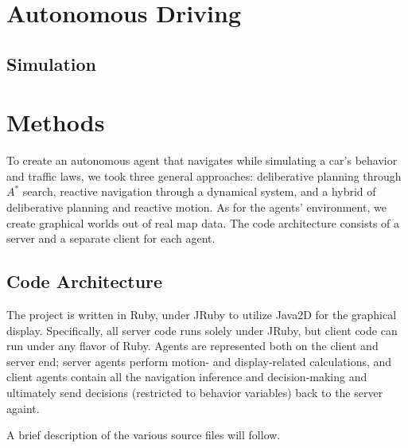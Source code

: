 \documentclass{article}
\begin{document}
\section{Autonomous Driving}

\subsection{Simulation}

\section{Methods}

To create an autonomous agent that navigates while simulating a car's behavior
and traffic laws, we took three general approaches: deliberative planning
through $A^*$ search, reactive navigation through a dynamical system, and a
hybrid of deliberative planning and reactive motion. As for the agents'
environment, we create graphical worlds out of real map data. The code
architecture consists of a server and a separate client for each agent.

\subsection{Code Architecture}

The project is written in Ruby, under JRuby to utilize Java2D for the graphical
display. Specifically, all server code runs solely under JRuby, but client
code can run under any flavor of Ruby. Agents are represented both on the client
and server end; server agents perform motion- and display-related
calculations, and client agents contain all the navigation inference and
decision-making and ultimately send decisions (restricted to behavior variables)
back to the server againt.

A brief description of the various source files will follow.
\end{document}
